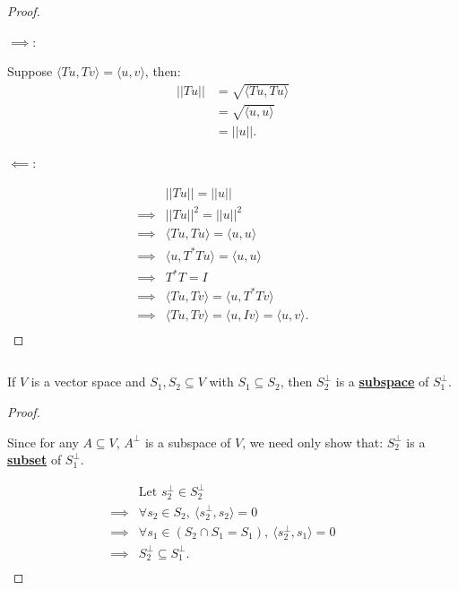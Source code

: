 \documentclass{article}
\newenvironment{customthm}[1]
  {\renewcommand\theinnercustomthm{#1}\innercustomthm}
  {\endinnercustomthm}
\begin{document}
\begin{proof}
  $ $

  \textbf{\underline{$\implies$}}:

  Suppose $\langle Tu, Tv \rangle = \langle u, v \rangle$, then:
  \begin{align*}
    ||Tu||
    &= \sqrt{\langle Tu, Tu \rangle} \\
    &= \sqrt{\langle u, u \rangle} \\
    &= ||u||.
  \end{align*}

  \textbf{\underline{$\impliedby$}}:

  \begin{align*}
    & ||Tu||
    = ||u|| &&\\
    \implies & ||Tu||^2
    = ||u||^2 &&\\
    \implies & 
    \langle
      Tu, Tu
    \rangle
    =
    \langle
      u, u
    \rangle &&\\
    \implies & 
    \langle
      u, T^*Tu
    \rangle
    =
    \langle
      u, u
    \rangle &&\\
    \implies & T^*T = I &&\\
    \implies & \langle
      Tu, Tv
    \rangle
    =
    \langle
      u, T^*Tv
    \rangle &&\\
    \implies & \langle
      Tu, Tv
    \rangle
    =
    \langle
      u, Iv
    \rangle 
    =
    \langle
      u, v
    \rangle. &&\\
  \end{align*}

\end{proof}
\newpage


\begin{customthm}{12}[2022.S(1.A.i)]
  $ $

  If $V$ is a vector space and $S_1, S_2 \subseteq V$ with $S_1 \subseteq S_2$, then $S_2^\perp$ is a \textbf{\underline{subspace}} of $S_1^\perp$.
\end{customthm}

\begin{proof}
  $ $

  Since for any $A \subseteq V$, $A^\perp$ is a subspace of $V$, we need only show that: $S^\perp_2$ is a \textbf{{\underline{subset}}} of $S^\perp_1$.

  \begin{align*}
    & \text{Let } s^\perp_2 \in S^\perp_2 &&\\
    \implies & \forall s_2 \in S_2, \:
    \langle
      s^\perp_2, s_2
    \rangle = 0 &&\\
    \implies & \forall s_1 \in (S_2 \cap S_1 = S_1), \:
    \langle
      s^\perp_2, s_1
    \rangle = 0 &&\\
    \implies & S^\perp_2 \subseteq S^\perp_1. &&\\
  \end{align*}


\end{proof}
\newpage
\end{document}
